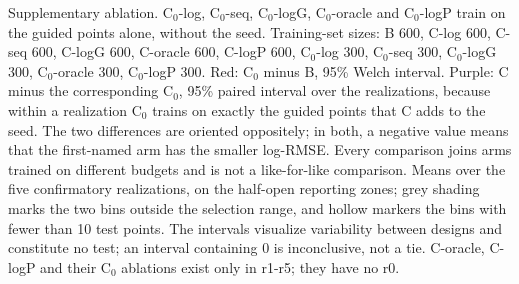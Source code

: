 Supplementary ablation. C$_0$-log, C$_0$-seq, C$_0$-logG, C$_0$-oracle and C$_0$-logP train on the guided points alone, without the seed. Training-set sizes: B 600, C-log 600, C-seq 600, C-logG 600, C-oracle 600, C-logP 600, C$_0$-log 300, C$_0$-seq 300, C$_0$-logG 300, C$_0$-oracle 300, C$_0$-logP 300. Red: C$_0$ minus B, 95\% Welch interval. Purple: C minus the corresponding C$_0$, 95\% paired interval over the realizations, because within a realization C$_0$ trains on exactly the guided points that C adds to the seed. The two differences are oriented oppositely; in both, a negative value means that the first-named arm has the smaller log-RMSE. Every comparison joins arms trained on different budgets and is not a like-for-like comparison. Means over the five confirmatory realizations, on the half-open reporting zones; grey shading marks the two bins outside the selection range, and hollow markers the bins with fewer than 10 test points. The intervals visualize variability between designs and constitute no test; an interval containing 0 is inconclusive, not a tie. C-oracle, C-logP and their C$_0$ ablations exist only in r1-r5; they have no r0.
